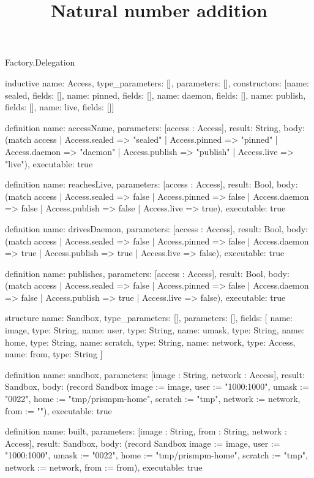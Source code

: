 \begin{lexlean}{Factory.Delegation}
\title{Natural number addition}
\begin{semanticmodule}
inductive{
  name: Access,
  type_parameters: [],
  parameters: [],
  constructors: [{name: sealed, fields: []}, {name: pinned, fields: []}, {name: daemon, fields: []}, {name: publish, fields: []}, {name: live, fields: []}]
}

definition{
  name: accessName,
  parameters: [access : Access],
  result: String,
  body: (match access
    | Access.sealed => "sealed"
    | Access.pinned => "pinned"
    | Access.daemon => "daemon"
    | Access.publish => "publish"
    | Access.live => "live"),
  executable: true
}

definition{
  name: reachesLive,
  parameters: [access : Access],
  result: Bool,
  body: (match access
    | Access.sealed => false
    | Access.pinned => false
    | Access.daemon => false
    | Access.publish => false
    | Access.live => true),
  executable: true
}

definition{
  name: drivesDaemon,
  parameters: [access : Access],
  result: Bool,
  body: (match access
    | Access.sealed => false
    | Access.pinned => false
    | Access.daemon => true
    | Access.publish => true
    | Access.live => false),
  executable: true
}

definition{
  name: publishes,
  parameters: [access : Access],
  result: Bool,
  body: (match access
    | Access.sealed => false
    | Access.pinned => false
    | Access.daemon => false
    | Access.publish => true
    | Access.live => false),
  executable: true
}

structure{
  name: Sandbox,
  type_parameters: [],
  parameters: [],
  fields: [
    {name: image, type: String},
    {name: user, type: String},
    {name: umask, type: String},
    {name: home, type: String},
    {name: scratch, type: String},
    {name: network, type: Access},
    {name: from, type: String}
  ]
}

definition{
  name: sandbox,
  parameters: [image : String, network : Access],
  result: Sandbox,
  body: (record Sandbox {image := image, user := "1000:1000", umask := "0022", home := "tmp/prismpm-home", scratch := "tmp", network := network, from := ""}),
  executable: true
}

definition{
  name: built,
  parameters: [image : String, from : String, network : Access],
  result: Sandbox,
  body: (record Sandbox {image := image, user := "1000:1000", umask := "0022", home := "tmp/prismpm-home", scratch := "tmp", network := network, from := from}),
  executable: true
}


\end{semanticmodule}
\end{lexlean}
